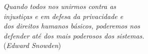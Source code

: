 \begin{epigrafe}
\vspace*{\fill}
\begin{flushright}
\textit{Quando todos nos unirmos contra as \\
injustiças e em defesa da privacidade e \\
dos direitos humanos básicos, poderemos nos \\
defender até dos mais poderosos dos sistemas. \\}
\vspace{3mm}
(\textit{Edward Snowden})
\end{flushright}
\end{epigrafe}
